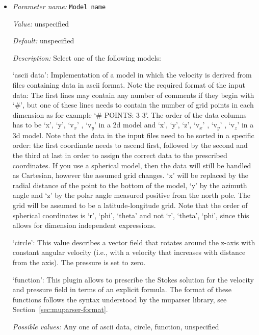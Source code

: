 \begin{itemize}
\item {\it Parameter name:} {\tt Model name}
\label{parameters:Prescribed Stokes solution/Model name}
\label{parameters:Prescribed_20Stokes_20solution/Model_20name}


{\it Value:} unspecified


{\it Default:} unspecified


{\it Description:} Select one of the following models:

`ascii data': Implementation of a model in which the velocity is derived from files containing data in ascii format. Note the required format of the input data: The first lines may contain any number of comments if they begin with `#', but one of these lines needs to contain the number of grid points in each dimension as for example `# POINTS: 3 3'. The order of the data columns has to be `x', `y', `v${}_x$' , `v${}_y$' in a 2d model and  `x', `y', `z', `v${}_x$' , `v${}_y$' , `v${}_z$' in a 3d model. Note that the data in the input files need to be sorted in a specific order: the first coordinate needs to ascend first, followed by the second and the third at last in order to assign the correct data to the prescribed coordinates. If you use a spherical model, then the data will still be handled as Cartesian, however the assumed grid changes. `x' will be replaced by the radial distance of the point to the bottom of the model, `y' by the azimuth angle and `z' by the polar angle measured positive from the north pole. The grid will be assumed to be a latitude-longitude grid. Note that the order of spherical coordinates is `r', `phi', `theta' and not `r', `theta', `phi', since this allows for dimension independent expressions.

`circle': This value describes a vector field that rotates around the z-axis with constant angular velocity (i.e., with a velocity that increases with distance from the axis). The pressure is set to zero.

`function': This plugin allows to prescribe the Stokes solution for the velocity and pressure field in terms of an explicit formula. The format of these functions follows the syntax understood by the muparser library, see Section~\ref{sec:muparser-format}.


{\it Possible values:} Any one of ascii data, circle, function, unspecified
\end{itemize}



